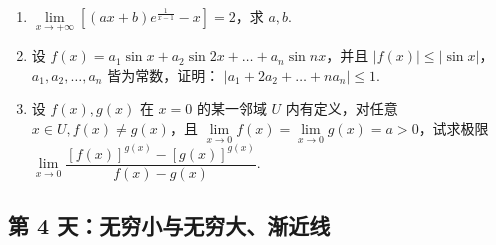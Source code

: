 \newpage

\begin{enumerate}[label=\textbf{\arabic*.}, itemsep=7cm, resume]
    \item $\lim\limits_{x \to +\infty} \left[ (ax+b) e^{\frac{1}{x-1}} - x \right] = 2$，求 $a, b$.

    \item 设 $f(x) = a_1 \sin x + a_2 \sin 2x + \dots + a_n \sin nx$，并且 $|f(x)| \le |\sin x|$，$a_1, a_2, \dots, a_n$ 皆为常数，证明：
    $ |a_1 + 2a_2 + \dots + na_n| \le 1. $

    \item 设 $f(x), g(x)$ 在 $x=0$ 的某一邻域 $U$ 内有定义，对任意 $x \in U, f(x) \ne g(x)$，且 $\lim\limits_{x \to 0} f(x) = \lim\limits_{x \to 0} g(x) = a > 0$，试求极限 $\lim\limits_{x \to 0} \dfrac{[f(x)]^{g(x)} - [g(x)]^{g(x)}}{f(x) - g(x)}$.
\end{enumerate}

\newpage
\subsection*{第 4 天：无穷小与无穷大、渐近线}
\vspace{1cm}

